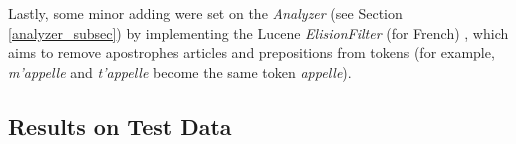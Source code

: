 Lastly, some minor adding were set on the \textit{Analyzer} (see Section \ref{analyzer_subsec}) by implementing the Lucene \textit{ElisionFilter} (for French) \cite{luceneelisionfilter}, which aims to remove apostrophes articles and prepositions from tokens (for example, \textit{m'appelle} and \textit{t'appelle} become the same token \textit{appelle}).


\subsection{Results on Test Data}
\label{subsec:results_submission}




